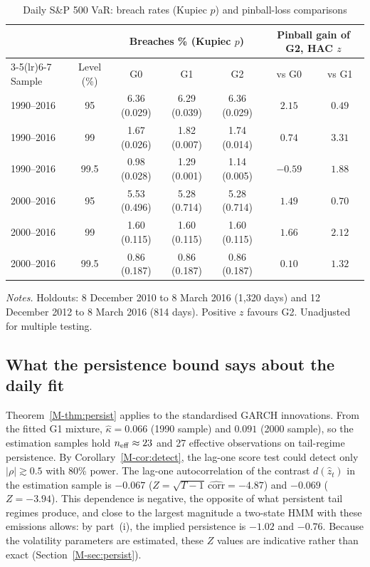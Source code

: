 \documentclass[11pt,a4paper]{article}
\theoremstyle{plain}
\theoremstyle{remark}
\begin{document}
\begin{table}[ht]
\centering\small
\caption{Daily S\&P 500 VaR: breach rates (Kupiec $p$) and pinball-loss comparisons}\label{tab:dailyAvar}
\begin{tabular}{lcccccc}
\toprule
 & & \multicolumn{3}{c}{Breaches \% (Kupiec $p$)} & \multicolumn{2}{c}{Pinball gain of G2, HAC $z$}\\
\cmidrule(lr){3-5}\cmidrule(lr){6-7}
Sample & Level (\%) & G0 & G1 & G2 & vs G0 & vs G1\\
\midrule
1990--2016 & 95 & 6.36 (0.029) & 6.29 (0.039) & 6.36 (0.029) & $2.15$ & $0.49$\\
1990--2016 & 99 & 1.67 (0.026) & 1.82 (0.007) & 1.74 (0.014) & $0.74$ & $3.31$\\
1990--2016 & 99.5 & 0.98 (0.028) & 1.29 (0.001) & 1.14 (0.005) & $-0.59$ & $1.88$\\
2000--2016 & 95 & 5.53 (0.496) & 5.28 (0.714) & 5.28 (0.714) & $1.49$ & $0.70$\\
2000--2016 & 99 & 1.60 (0.115) & 1.60 (0.115) & 1.60 (0.115) & $1.66$ & $2.12$\\
2000--2016 & 99.5 & 0.86 (0.187) & 0.86 (0.187) & 0.86 (0.187) & $0.10$ & $1.32$\\
\bottomrule
\end{tabular}
\par\smallskip\footnotesize\emph{Notes.} Holdouts: 8 December 2010 to 8 March 2016 (1{,}320 days) and 12 December 2012 to 8 March 2016 (814 days). Positive $z$ favours G2. Unadjusted for multiple testing.
\end{table}

\subsection{What the persistence bound says about the daily fit}
Theorem~\ref{M-thm:persist} applies to the standardised GARCH innovations. From the fitted G1 mixture, $\hat\kappa=0.066$ (1990 sample) and $0.091$ (2000 sample), so the estimation samples hold $n_{\rm eff}\approx23$ and 27 effective observations on tail-regime persistence. By Corollary~\ref{M-cor:detect}, the lag-one score test could detect only $|\rho|\gtrsim0.5$ with 80\% power. The lag-one autocorrelation of the contrast $d(\hat z_t)$ in the estimation sample is $-0.067$ ($Z=\sqrt{T-1}\,\widehat{\mathrm{corr}}=-4.87$) and $-0.069$ ($Z=-3.94$). This dependence is negative, the opposite of what persistent tail regimes produce, and close to the largest magnitude a two-state HMM with these emissions allows: by part~(i), the implied persistence is $-1.02$ and $-0.76$. Because the volatility parameters are estimated, these $Z$ values are indicative rather than exact (Section~\ref{M-sec:persist}).
\end{document}
